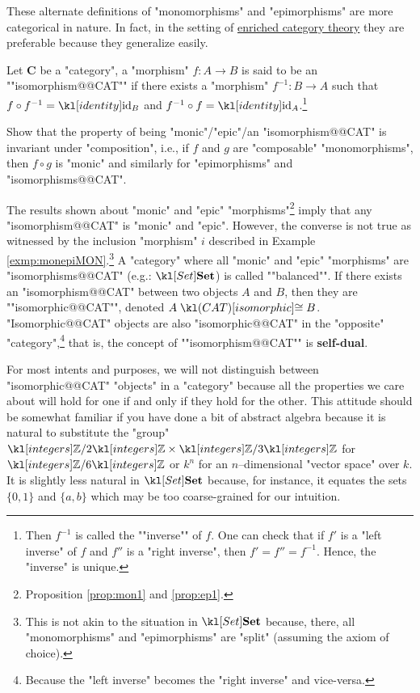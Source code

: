 \documentclass[main.tex]{subfiles}
\begin{document}
\begin{rem}
	These alternate definitions of "monomorphisms" and "epimorphisms" are more categorical in nature. In fact, in the setting of \href{https://ncatlab.org/nlab/show/enriched+category+theory}{enriched category theory} they are preferable because they generalize easily.
\end{rem}
\begin{defn}[Isomorphism]\label{defn:isomorphism}
	\AP Let $\mathbf{C}$ be a "category", a "morphism" $f:A\rightarrow B$ is said to be an ""isomorphism@@CAT"" if there exists a "morphism" $f^{-1}: B\rightarrow A$ such that $f\circ f^{-1} = \id_B$ and $f^{-1}\circ f = \id_A$.\footnote{\AP Then $f^{-1}$ is called the ""inverse"" of $f$. One can check that if $f'$ is a "left inverse" of $f$ and $f''$ is a "right inverse", then $f' = f'' = f^{-1}$. Hence, the "inverse" is unique.}
\end{defn}
\begin{exer}\label{exer:duality:composemor}
	Show that the property of being "monic"/"epic"/an "isomorphism@@CAT" is invariant under "composition", i.e., if $f$ and $g$ are "composable" "monomorphisms", then $f \circ g$ is "monic" and similarly for "epimorphisms" and "isomorphisms@@CAT".
\end{exer}
\begin{rem}
	The results shown about "monic" and "epic" "morphisms"\footnote{Proposition \ref{prop:mon1} and \ref{prop:ep1}.} imply that any "isomorphism@@CAT" is "monic" and "epic". However, the converse is not true as witnessed by the inclusion "morphism" $i$ described in Example \ref{exmp:monepiMON}.\footnote{This is not akin to the situation in $\catSet$ because, there, all "monomorphisms" and "epimorphisms" are "split" (assuming the axiom of choice).} \AP A "category" where all "monic" and "epic" "morphisms" are "isomorphisms@@CAT" (e.g.: $\catSet$) is called ""balanced"". \AP If there exists an "isomorphism@@CAT" between two objects $A$ and $B$, then they are ""isomorphic@@CAT"", denoted $A \isoCAT B$. "Isomorphic@@CAT" objects are also "isomorphic@@CAT" in the "opposite" "category",\footnote{Because the "left inverse" becomes the "right inverse" and vice-versa.} that is, the concept of ""isomorphism@@CAT"" is \textbf{self-dual}.
	
	For most intents and purposes, we will not distinguish between "isomorphic@@CAT" "objects" in a "category" because all the properties we care about will hold for one if and only if they hold for the other. This attitude should be somewhat familiar if you have done a bit of abstract algebra because it is natural to substitute the "group" $\Z/2\Z \times \Z/3\Z$ for $\Z/6\Z$ or $k^n$ for an $n$--dimensional "vector space" over $k$. It is slightly less natural in $\catSet$ because, for instance, it equates the sets $\{0,1\}$ and $\{a,b\}$ which may be too coarse-grained for our intuition.
\end{rem}
\end{document}
